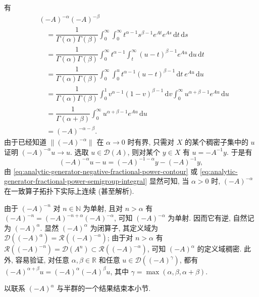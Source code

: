 \begin{Proof}
有\[\begin{aligned}
&(-A)^{-\alpha}(-A)^{-\beta}\\
&\quad=\dfrac{1}{\Gamma(\alpha)\Gamma(\beta)}\int_0^\infty\int_0^\infty t^{\alpha-1}s^{\beta-1}e^{At}e^{As}\,\mathrm{d}t\,\mathrm{d}s\\
&\quad=\dfrac{1}{\Gamma(\alpha)\Gamma(\beta)}\int_0^\infty t^{\alpha-1}\int_t^\infty(u-t)^{\beta-1}e^{Au}\,\mathrm{d}u\,\mathrm{d}t\\
&\quad=\dfrac{1}{\Gamma(\alpha)\Gamma(\beta)}\int_0^\infty\int_0^u t^{\alpha-1}(u-t)^{\beta-1}\,\mathrm{d}t\ e^{Au}\,\mathrm{d}u\\
&\quad=\dfrac{1}{\Gamma(\alpha)\Gamma(\beta)}\int_0^1 v^{\alpha-1}(1-v)^{\beta-1}\,\mathrm{d}v\int_0^\infty u^{\alpha+\beta-1}e^{Au}\,\mathrm{d}u\\
&\quad=\dfrac{1}{\Gamma(\alpha+\beta)}\int_0^\infty u^{\alpha+\beta-1}e^{Au}\,\mathrm{d}u\\
&\quad=(-A)^{-\alpha-\beta}.
\end{aligned}\]由于已经知道 $\|(-A)^{-\alpha}\|$ 在 $\alpha\to0$ 时有界, 只需对 $X$ 的某个稠密子集中的 $u$ 证明 $(-A)^{-\alpha}u\to u$. 选取 $u\in\mathcal{D}(A)$, 则对某个 $y\in X$ 有 $u=-A^{-1}y$. 于是有
\begin{equation}\label{eq:fractional-power-semigroup-strong-continuity-reduction}
(-A)^{-\alpha}u-u=(-A)^{-1-\alpha}y-(-A)^{-1}y,
\end{equation}
由 \eqref{eq:analytic-generator-negative-fractional-power-contour} 或 \eqref{eq:analytic-generator-fractional-power-semigroup-integral} 显然可知, 当 $\alpha>0$ 时, $(-A)^{-\alpha}$ 在一致算子拓扑下实际上连续 (甚至解析).
\end{Proof}

由于 $(-A)^{-n}$ 对 $n\in\mathbb{N}$ 为单射, 且对 $n>\alpha$ 有 $(-A)^{-n}=(-A)^{-n+\alpha}(-A)^{-\alpha}$, 可知 $(-A)^{-\alpha}$ 为单射. 因而它有逆, 自然记为 $(-A)^\alpha$. 显然 $(-A)^\alpha$ 为闭算子, 其定义域为 $\mathcal{D}((-A)^\alpha)=\mathcal{R}((-A)^{-\alpha})$; 由于对 $n>\alpha$ 有 $\mathcal{R}((-A)^{-n})=\mathcal{D}(A^n)\subset\mathcal{R}((-A)^{-\alpha})$, 可知 $(-A)^\alpha$ 的定义域稠密. 此外, 容易验证, 对任意 $\alpha,\beta\in\mathbb{R}$ 和任意 $u\in\mathcal{D}((-A)^\gamma)$, 都有 $(-A)^{\alpha+\beta}u=(-A)^\alpha(-A)^\beta u$, 其中 $\gamma=\max(\alpha,\beta,\alpha+\beta)$.\par 以联系 $(-A)^\alpha$ 与半群的一个结果结束本小节.

